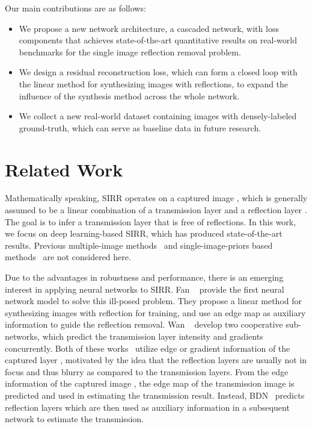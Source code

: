 \documentclass[10pt,twocolumn,letterpaper]{article}
\begin{document}
Our main contributions are as follows:
\begin{itemize}[noitemsep,topsep=0pt]
    \setlength{\itemsep}{1pt}
    \setlength{\parskip}{0pt}
    \setlength{\parsep}{0pt}
    \item We propose a new network architecture, a cascaded network, with loss components that achieves state-of-the-art quantitative results on real-world benchmarks for the single image reflection removal problem.
\item We design a residual reconstruction loss, which can form a closed loop with the linear method for synthesizing images with reflections, to expand the influence of the synthesis method across the whole network.
    \item We collect a new real-world dataset containing images with densely-labeled ground-truth, which can serve as baseline data in future research. 
\end{itemize}

\section{Related Work}
Mathematically speaking, SIRR operates on a captured image , which is generally assumed to be a linear combination of a transmission layer  and a reflection layer . The goal is to infer a transmission layer  that is free of reflections. 
In this work, we focus on deep learning-based SIRR, which has produced state-of-the-art results. Previous multiple-image methods~\cite{xue2015computational, guo2014robust, li2013exploiting, sun2016automatic, sarel2004separating, gai2011blind, szeliski2000layer, han2017reflection} and single-image-priors based methods~\cite{levin2004separating, li2014single, levin2003learning, springer2017reflection, arvanitopoulos2017single, wan2016depth, li2013exploiting, tuncer2011ground} are not considered here.


Due to the advantages in robustness and performance, there is an emerging interest in applying neural networks to SIRR. Fan \etal~\cite{fan2017generic} provide the first neural network model to solve this ill-posed problem. They propose a linear method for synthesizing images with reflection for training, and use an edge map as auxiliary information to guide the reflection removal. Wan \etal~\cite{wan2018crrn} develop two cooperative sub-networks, which predict the transmission layer intensity and gradients concurrently. Both of these works~\cite{fan2017generic, wan2018crrn} utilize edge or gradient information of the captured layer , motivated by the idea that the reflection layers are usually not in focus and thus blurry as compared to the transmission layers. 
From the edge information of the captured image , the edge map of the transmission image  is predicted and used in estimating the transmission result.
Instead, BDN~\cite{yang2018seeing} predicts reflection layers which are then used as auxiliary information in a subsequent network to estimate the transmission.
\end{document}
